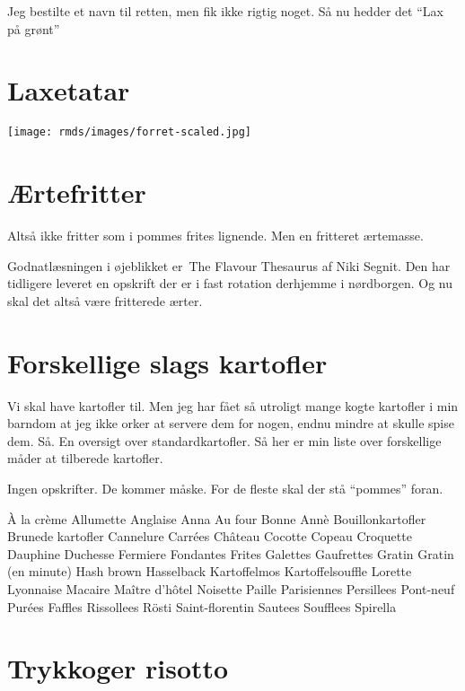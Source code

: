 \documentclass[
  letterpaper,
  DIV=11,
  numbers=noendperiod]{scrreprt}
\begin{document}
Jeg bestilte et navn til retten, men fik ikke rigtig noget. Så nu hedder
det ``Lax på grønt''

\hypertarget{laxetatar}{%
\section{Laxetatar}\label{laxetatar}}

\texttt{[image: rmds/images/forret-scaled.jpg]}

\hypertarget{uxe6rtefritter}{%
\section{Ærtefritter}\label{uxe6rtefritter}}

Altså ikke fritter som i pommes frites lignende. Men en fritteret
ærtemasse.

Godnatlæsningen i øjeblikket er~The Flavour Thesaurus af Niki Segnit.
Den har tidligere leveret en opskrift der er i fast rotation derhjemme i
nørdborgen. Og nu skal det altså være fritterede ærter.

\hypertarget{forskellige-slags-kartofler}{%
\section{Forskellige slags
kartofler}\label{forskellige-slags-kartofler}}

Vi skal have kartofler til. Men jeg har fået så utroligt mange kogte
kartofler i min barndom at jeg ikke orker at servere dem for nogen,
endnu mindre at skulle spise dem. Så. En oversigt over
standardkartofler. Så her er min liste over forskellige måder at
tilberede kartofler.

Ingen opskrifter. De kommer måske. For de fleste skal der stå ``pommes''
foran.

À la crème Allumette Anglaise Anna Au four Bonne Annè Bouillonkartofler
Brunede kartofler Cannelure Carrées Château Cocotte Copeau Croquette
Dauphine Duchesse Fermiere Fondantes Frites Galettes Gaufrettes Gratin
Gratin (en minute) Hash brown Hasselback Kartoffelmos Kartoffelsouffle
Lorette Lyonnaise Macaire Maître d'hôtel Noisette Paille Parisiennes
Persillees Pont-neuf Purées Faffles Rissollees Rösti Saint-florentin
Sautees Soufflees Spirella

\hypertarget{trykkoger-risotto}{%
\section{Trykkoger risotto}\label{trykkoger-risotto}}
\end{document}
